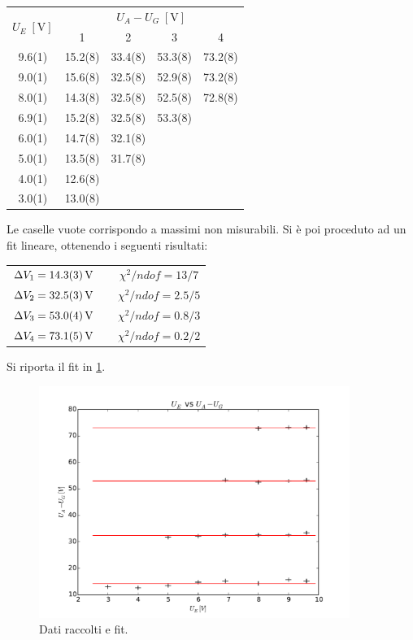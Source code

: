 	\begin{table}[H]
		\centering
		\begin{tabular}{ccccc}
			\toprule
			\multirow{2}{*}{$U_E\;[\si{\volt}]$}  &  \multicolumn{4}{c}{$U_A-U_G\;[\si{\volt}]$}\\
			&	1 & 2 & 3 & 4\\
			\midrule
			9.6(1) & 15.2(8) & 33.4(8) & 53.3(8) & 73.2(8)\\
			9.0(1) & 15.6(8) & 32.5(8) & 52.9(8) & 73.2(8)\\
			8.0(1) & 14.3(8) & 32.5(8) & 52.5(8) & 72.8(8)\\
			6.9(1) & 15.2(8) & 32.5(8) & 53.3(8)\\
			6.0(1) & 14.7(8) & 32.1(8)\\
			5.0(1) & 13.5(8) & 31.7(8)\\
			4.0(1) & 12.6(8)\\
			3.0(1) & 13.0(8)\\
			\bottomrule
		\end{tabular}
		\label{tab:a}
	\end{table}
Le caselle vuote corrispondo a massimi non misurabili.
Si è poi proceduto ad un fit lineare, ottenendo i seguenti risultati:
	\begin{table}[H]
		\centering
		\begin{tabular}{ccc}
			$\Delta V_1 = \SI{14.3 \pm 0.3}{\volt}$ && $\chi^2/ndof = 13/7$\\
			$\Delta V_2 = \SI{32.5 \pm 0.3}{\volt}$ && $\chi^2/ndof = 2.5/5$\\
			$\Delta V_3 = \SI{53.0 \pm 0.4}{\volt}$ && $\chi^2/ndof = 0.8/3$\\
			$\Delta V_4 = \SI{73.1 \pm 0.5}{\volt}$ && $\chi^2/ndof = 0.2/2$\\
		\end{tabular}
	\end{table}
	Si riporta il fit in \figurename{ \ref{fit}}.
	
		\begin{figure} [!h]
			\centering
			\includegraphics[width=0.9\textwidth]{../Figs-tabs/fit.pdf}
			\caption{Dati raccolti e fit.}
			\label{fit}
		\end{figure}
		
